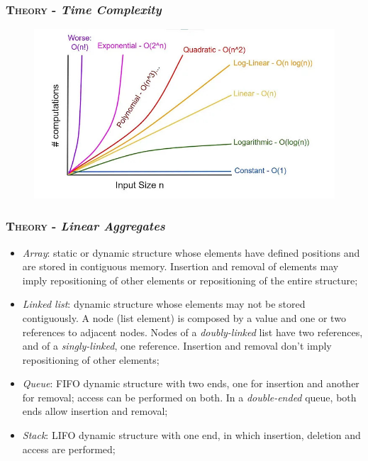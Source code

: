 \documentclass[10pt]{article}
\begin{document}
\begin{multicols*}{4}
{\subsubsection*{\textsc{Theory} - \emph{Time Complexity}} 
\begin{figure}[H]
\begin{center}
\includegraphics[scale=.21]{complexity.jpg}	
\end{center}
\end{figure}

\subsubsection*{\textsc{Theory} - \emph{Linear Aggregates}} 

\begin{itemize}[leftmargin=*,topsep=0.25pt]
  \setlength\itemsep{-1.8pt}
	\item \emph{Array}: static or dynamic structure whose elements have defined positions and are stored in contiguous memory. Insertion and removal of elements may imply repositioning of other elements or repositioning of the entire structure; 
	\item \emph{Linked list}: dynamic structure whose elements may not be stored contiguously. A node (list element) is composed by a value and one or two references to adjacent nodes. Nodes of a \emph{doubly-linked} list have two references, and of a \emph{singly-linked}, one reference. Insertion and removal don't imply repositioning of other elements;
	\item \emph{Queue}: FIFO dynamic structure with two ends, one for insertion and another for removal; access can be performed on both. In a \emph{double-ended} queue, both ends allow insertion and removal;  
	\item \emph{Stack}: LIFO dynamic structure with one end, in which insertion, deletion and access are performed;
\end{itemize}

}
\end{multicols*}
\end{document}
